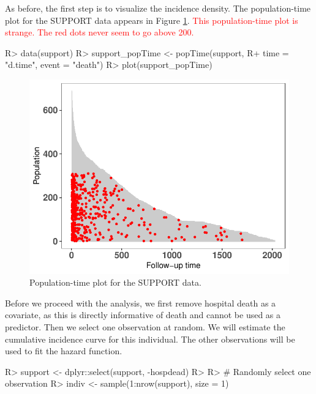 \documentclass[
]{jss}
\begin{document}
As before, the first step is to visualize the incidence density. The
population-time plot for the SUPPORT data appears in Figure
\ref{fig:support-poptime}.
\textcolor{red}{This population-time plot is strange. The red dots never seem to go above 200.}

\begin{CodeChunk}

\begin{CodeInput}
R> data(support)
R> support_popTime <- popTime(support,
R+                            time = "d.time", event = "death")
R> plot(support_popTime)
\end{CodeInput}
\begin{figure}

{\centering \includegraphics{../figures/support-poptime-1} 

}

\caption{\label{fig:support-poptime} Population-time plot for the SUPPORT data.}\label{fig:support-poptime}
\end{figure}
\end{CodeChunk}

Before we proceed with the analysis, we first remove hospital death as a
covariate, as this is directly informative of death and cannot be used
as a predictor. Then we select one observation at random. We will
estimate the cumulative incidence curve for this individual. The other
observations will be used to fit the hazard function.

\begin{CodeChunk}

\begin{CodeInput}
R> support <- dplyr::select(support, -hospdead)
R> 
R> # Randomly select one observation
R> indiv <- sample(1:nrow(support), size = 1)
\end{CodeInput}
\end{CodeChunk}
\end{document}

